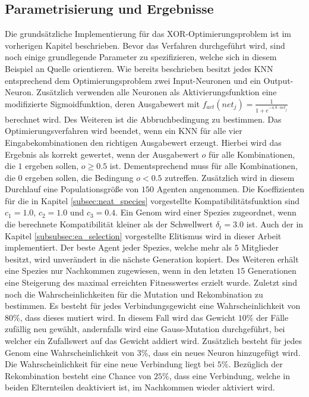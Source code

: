 \subsection{Parametrisierung und Ergebnisse}
Die grundsätzliche Implementierung für das XOR-Optimierungsproblem ist im vorherigen Kapitel beschrieben. Bevor das Verfahren durchgeführt wird, sind noch einige grundlegende Parameter zu spezifizieren, welche sich in diesem Beispiel an Quelle \cite{stanley2002evolving} orientieren. Wie bereits beschrieben besitzt jedes \ac{KNN} entsprechend dem Optimierungsproblem zwei Input-Neuronen und ein Output-Neuron. Zusätzlich verwenden alle Neuronen als Aktivierungsfunktion eine modifizierte Sigmoidfunktion, deren Ausgabewert mit $f_{act}(net_j)=\frac{1}{1+e^{-4.9\cdot net_j}}$ berechnet wird. Des Weiteren ist die Abbruchbedingung zu bestimmen. Das Optimierungsverfahren wird beendet, wenn ein \ac{KNN} für alle vier Eingabekombinationen den richtigen Ausgabewert erzeugt. Hierbei wird das Ergebnis als korrekt gewertet, wenn der Ausgabewert $o$ für alle Kombinationen, die $1$ ergeben sollen, $o \geq 0.5$ ist. Dementsprechend muss für alle Kombinationen, die $0$ ergeben sollen, die Bedingung $o < 0.5$ zutreffen. Zusätzlich wird in diesem Durchlauf eine Populationsgröße von $150$ Agenten angenommen. Die Koeffizienten für die in Kapitel \ref{subsec:neat_species} vorgestellte Kompatibilitätsfunktion sind $c_1=1.0$, $c_2=1.0$ und $c_3=0.4$. Ein Genom wird einer Spezies zugeordnet, wenn die berechnete Kompatibilität kleiner als der Schwellwert $\delta_t=3.0$ ist. Auch der in Kapitel \ref{subsubsec:ea_selection} vorgestellte Elitismus wird in dieser Arbeit implementiert. Der beste Agent jeder Spezies, welche mehr als $5$ Mitglieder besitzt, wird unverändert in die nächste Generation kopiert. Des Weiteren erhält eine Spezies nur Nachkommen zugewiesen, wenn in den letzten $15$ Generationen eine Steigerung des maximal erreichten Fitnesswertes erzielt wurde. Zuletzt sind noch die Wahrscheinlichkeiten für die Mutation und Rekombination zu bestimmen. Es besteht für jedes Verbindungsgewicht eine Wahrscheinlichkeit von $80\%$, dass dieses mutiert wird. In diesem Fall wird das Gewicht $10\%$ der Fälle zufällig neu gewählt, andernfalls wird eine Gauss-Mutation durchgeführt, bei welcher ein Zufallswert auf das Gewicht addiert wird. Zusätzlich besteht für jedes Genom eine Wahrscheinlichkeit von $3\%$, dass ein neues Neuron hinzugefügt wird. Die Wahrscheinlichkeit für eine neue Verbindung liegt bei  $5\%$. Bezüglich der Rekombination besteht eine Chance von $25\%$, dass eine Verbindung, welche in beiden Elternteilen deaktiviert ist, im Nachkommen wieder aktiviert wird. 
